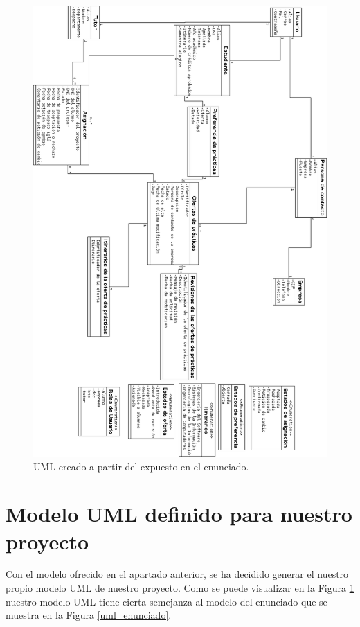 \documentclass[pdftex,11pt,a4paper]{book}
\begin{document}
\begin{figure}[]
\begin{center}
\includegraphics[width=\textwidth]{img/uml_propio}
\caption{\label{uml_propio} UML creado a partir del expuesto en el enunciado.}
\end{center}
\end{figure}

\section{Modelo UML definido para nuestro proyecto}

Con el modelo ofrecido en el apartado anterior, se ha decidido generar el nuestro propio modelo UML de nuestro proyecto. Como se puede visualizar en la Figura \ref{uml_propio} nuestro modelo UML tiene cierta semejanza al modelo del enunciado que se muestra en la Figura \ref{uml_enunciado}.
\end{document}

